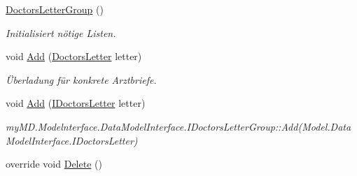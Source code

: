 \begin{CompactItemize}
\item 
\hypertarget{classmy_m_d_1_1_model_1_1_data_model_1_1_doctors_letter_group_dd58debd7814722f4209cd2d02e8586f}{
\hyperlink{classmy_m_d_1_1_model_1_1_data_model_1_1_doctors_letter_group_dd58debd7814722f4209cd2d02e8586f}{Doctors\-Letter\-Group} ()}
\label{db/dfe/classmy_m_d_1_1_model_1_1_data_model_1_1_doctors_letter_group_dd58debd7814722f4209cd2d02e8586f}

\begin{CompactList}\small\item\em Initialisiert n\"{o}tige Listen. \item\end{CompactList}\item 
void \hyperlink{classmy_m_d_1_1_model_1_1_data_model_1_1_doctors_letter_group_6de945f2b75d0439ee78a7a0aa5f3856}{Add} (\hyperlink{classmy_m_d_1_1_model_1_1_data_model_1_1_doctors_letter}{Doctors\-Letter} letter)
\begin{CompactList}\small\item\em \"{U}berladung f\"{u}r konkrete Arztbriefe. \item\end{CompactList}\item 
\hypertarget{classmy_m_d_1_1_model_1_1_data_model_1_1_doctors_letter_group_369225fad276ca62dd1bd8f6a68ba24f}{
void \hyperlink{classmy_m_d_1_1_model_1_1_data_model_1_1_doctors_letter_group_369225fad276ca62dd1bd8f6a68ba24f}{Add} (\hyperlink{interfacemy_m_d_1_1_model_interface_1_1_data_model_interface_1_1_i_doctors_letter}{IDoctors\-Letter} letter)}
\label{db/dfe/classmy_m_d_1_1_model_1_1_data_model_1_1_doctors_letter_group_369225fad276ca62dd1bd8f6a68ba24f}

\begin{CompactList}\small\item\em my\-MD.Modelnterface.Data\-Model\-Interface.IDoctors\-Letter\-Group::Add(Model.Data\-Model\-Interface.IDoctors\-Letter) \item\end{CompactList}\item 
\hypertarget{classmy_m_d_1_1_model_1_1_data_model_1_1_doctors_letter_group_51a833214dab53bfafb630573fc0fe77}{
override void \hyperlink{classmy_m_d_1_1_model_1_1_data_model_1_1_doctors_letter_group_51a833214dab53bfafb630573fc0fe77}{Delete} ()}
\label{db/dfe/classmy_m_d_1_1_model_1_1_data_model_1_1_doctors_letter_group_51a833214dab53bfafb630573fc0fe77}


\end{CompactItemize}
